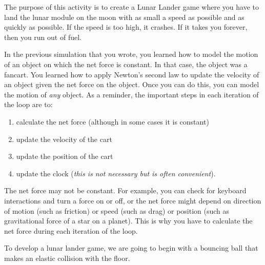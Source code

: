 
\apparatus
{}

\longgoal

The purpose of this activity is to create a Lunar Lander game where you have to land the lunar module on the moon with as small a speed as possible and as quickly as possible. If the speed is too high, it crashes. If it takes you forever, then you run out of fuel.

\procedure

In the previous simulation that you wrote, you learned how to model the motion of an object on which the net force is constant. In that case, the object was a fancart. You learned how to apply Newton's second law to update the velocity of an object given the net force on the object. Once you can do this, you can model the motion of \emph{any} object. As a reminder, the important steps in each iteration of the loop are to:

	\begin{enumerate}
		\item calculate the net force (although in some cases it is constant)
		\item update the velocity of the cart
		\item update the position of the cart
		\item update the clock (\emph{this is not necessary but is often convenient}).
	\end{enumerate}
	
The net force may not be constant. For example, you can check for keyboard interactions and turn a force on or off, or the net force might depend on direction of motion (such as friction) or speed (such as drag) or position (such as gravitational force of a star on a planet). This is why you have to calculate the net force during each iteration of the loop.

To develop a lunar lander game, we are going to begin with a bouncing ball that makes an elastic collision with the floor. 

